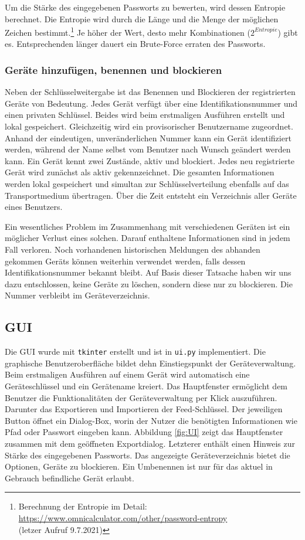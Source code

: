 \documentclass[a4paper,titlepage]{article}
\newcommand{\ilc}[1]{\textcolor{codeColor}{\texttt{#1}}}
\begin{document}
Um die Stärke des eingegebenen Passworts zu bewerten, wird dessen Entropie berechnet. Die Entropie wird durch die Länge und die Menge der möglichen Zeichen bestimmt.\footnote{Berechnung der Entropie im Detail: \\ \url{https://www.omnicalculator.com/other/password-entropy} \\ (letzer Aufruf 9.7.2021)} Je höher der Wert, desto mehr Kombinationen ($2^{Entropie}$) gibt es. Entsprechenden länger dauert ein Brute-Force erraten des Passworts.

\subsubsection*{Geräte hinzufügen, benennen und blockieren}
Neben der Schlüsselweitergabe ist das Benennen und Blockieren der registrierten Geräte von Bedeutung. Jedes Gerät verfügt über eine Identifikationsnummer und einen privaten Schlüssel. Beides wird beim erstmaligen Ausführen erstellt und lokal gespeichert. Gleichzeitig wird ein provisorischer Benutzername zugeordnet. Anhand der eindeutigen, unveränderlichen Nummer kann ein Gerät identifiziert werden, während der Name selbst vom Benutzer nach Wunsch geändert werden kann. Ein Gerät kennt zwei Zustände, aktiv und blockiert. Jedes neu registrierte Gerät wird zunächst als aktiv gekennzeichnet. Die gesamten Informationen werden lokal gespeichert und simultan zur Schlüsselverteilung ebenfalls auf das Transportmedium übertragen. Über die Zeit entsteht ein Verzeichnis aller Geräte eines Benutzers.

Ein wesentliches Problem im Zusammenhang mit verschiedenen Geräten ist ein möglicher Verlust eines solchen. Darauf enthaltene Informationen sind in jedem Fall verloren. Noch vorhandenen historischen Meldungen des abhanden gekommen Geräts können weiterhin verwendet werden, falls dessen Identifikationsnummer bekannt bleibt. Auf Basis dieser Tatsache haben wir uns dazu entschlossen, keine Geräte zu löschen, sondern diese nur zu blockieren. Die Nummer verbleibt im Geräteverzeichnis.

\subsection{GUI}
Die GUI wurde mit \ilc{tkinter} erstellt und ist in \ilc{ui.py} implementiert. Die graphische Benutzeroberfläche bildet dehn Einstiegspunkt der Geräteverwaltung. Beim erstmaligen Ausführen auf einem Gerät wird automatisch eine Geräteschlüssel und ein Gerätename kreiert. Das Hauptfenster ermöglicht dem Benutzer die Funktionalitäten der Geräteverwaltung per Klick auszuführen. Darunter das Exportieren und Importieren der Feed-Schlüssel. Der jeweiligen Button öffnet ein Dialog-Box, worin der Nutzer die benötigten Informationen wie Pfad oder Passwort eingeben kann. Abbildung \ref{fig:UI} zeigt das Hauptfenster zusammen mit dem geöffneten Exportdialog. Letzterer enthält einen Hinweis zur Stärke des eingegebenen Passworts. Das angezeigte Geräteverzeichnis bietet die Optionen, Geräte zu blockieren. Ein Umbenennen ist nur für das aktuel in Gebrauch befindliche Gerät erlaubt.
\end{document}
